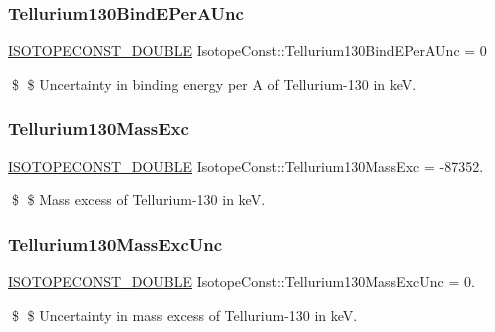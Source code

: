 \subsubsection{\texorpdfstring{Tellurium130\+Bind\+E\+Per\+A\+Unc}{Tellurium130BindEPerAUnc}}
{\footnotesize\ttfamily \mbox{\hyperlink{group___isotope_const-_macros_ga8f45a7272ce02c0b4c65c44636ed719a}{I\+S\+O\+T\+O\+P\+E\+C\+O\+N\+S\+T\+\_\+\+D\+O\+U\+B\+LE}} Isotope\+Const\+::\+Tellurium130\+Bind\+E\+Per\+A\+Unc = 0}

\$ \$ Uncertainty in binding energy per A of Tellurium-\/130 in keV. \mbox{\label{group___isotope_const-_tellurium-_te130_ga60abc6c0d41865a44953b5a662a0e4c5}} 
\subsubsection{\texorpdfstring{Tellurium130\+Mass\+Exc}{Tellurium130MassExc}}
{\footnotesize\ttfamily \mbox{\hyperlink{group___isotope_const-_macros_ga8f45a7272ce02c0b4c65c44636ed719a}{I\+S\+O\+T\+O\+P\+E\+C\+O\+N\+S\+T\+\_\+\+D\+O\+U\+B\+LE}} Isotope\+Const\+::\+Tellurium130\+Mass\+Exc = -\/87352.}

\$ \$ Mass excess of Tellurium-\/130 in keV. \mbox{\label{group___isotope_const-_tellurium-_te130_gabf9d56d669ec51724e0193784be00d82}} 
\subsubsection{\texorpdfstring{Tellurium130\+Mass\+Exc\+Unc}{Tellurium130MassExcUnc}}
{\footnotesize\ttfamily \mbox{\hyperlink{group___isotope_const-_macros_ga8f45a7272ce02c0b4c65c44636ed719a}{I\+S\+O\+T\+O\+P\+E\+C\+O\+N\+S\+T\+\_\+\+D\+O\+U\+B\+LE}} Isotope\+Const\+::\+Tellurium130\+Mass\+Exc\+Unc = 0.}

\$ \$ Uncertainty in mass excess of Tellurium-\/130 in keV. \mbox{\label{group___isotope_const-_tellurium-_te130_gab2edd6cb02b28416fa9fec77eccb2f7a}} 
